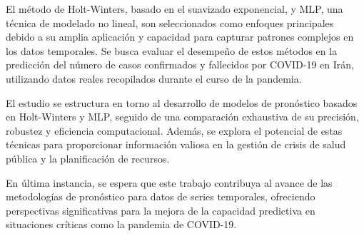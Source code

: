 \documentclass[
  us-letterpaper,
]{scrreprt}
\begin{document}
El método de Holt-Winters, basado en el suavizado exponencial, y MLP,
una técnica de modelado no lineal, son seleccionados como enfoques
principales debido a su amplia aplicación y capacidad para capturar
patrones complejos en los datos temporales. Se busca evaluar el
desempeño de estos métodos en la predicción del número de casos
confirmados y fallecidos por COVID-19 en Irán, utilizando datos reales
recopilados durante el curso de la pandemia.

El estudio se estructura en torno al desarrollo de modelos de pronóstico
basados en Holt-Winters y MLP, seguido de una comparación exhaustiva de
su precisión, robustez y eficiencia computacional. Además, se explora el
potencial de estas técnicas para proporcionar información valiosa en la
gestión de crisis de salud pública y la planificación de recursos.

En última instancia, se espera que este trabajo contribuya al avance de
las metodologías de pronóstico para datos de series temporales,
ofreciendo perspectivas significativas para la mejora de la capacidad
predictiva en situaciones críticas como la pandemia de COVID-19.
\end{document}

